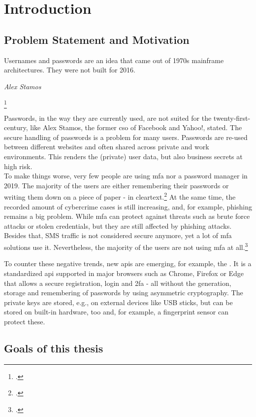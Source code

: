 \chapter{Introduction}
\label{chapter:introduction}

\section{Problem Statement and Motivation}

\setlength{}
\epigraph{\frqq Usernames and passwords are an idea that came out of 1970s mainframe architectures. They were not built for 2016.\flqq\footnotemark}{\textit{Alex Stamos}}
\footcitetext[See][]{stamos}

Passwords, in the way they are currently used, are not suited for the twenty-first-century, like Alex Stamos, the former \gls{cso} of Facebook and Yahoo!, stated. The secure handling of passwords is a problem for many users. Passwords are re-used between different websites and often shared across private and work environments. This renders the (private) user data, but also business secrets at high risk.\\
To make things worse, very few people are using \gls{mfa} nor a password manager in 2019. The majority of the users are either remembering their passwords or writing them down on a piece of paper - in cleartext.\footcites[See][]{ibm-security}[See][]{web-de-passwords}
At the same time, the recorded amount of cybercrime cases is still increasing, and, for example, phishing remains a big problem. While \gls{mfa} can protect against threats such as brute force attacks or stolen credentials, but they are still affected by phishing attacks. Besides that, SMS traffic is not considered secure anymore, yet a lot of \gls{mfa} solutions use it. Nevertheless, the majority of the users are not using \gls{mfa} at all.\footcites[See][]{infratest-dimap}[See][6--7]{bka-cybercrime}

To counter these negative trends, new \glspl{api} are emerging, for example, the \wa. It is a standardized \gls{api} supported in major browsers such as Chrome, Firefox or Edge that allows  a secure registration, login and \gls{2fa} - all without the generation, storage and remembering of passwords by using asymmetric cryptography. The private keys are stored, e.g., on external devices like USB sticks, but can be stored on built-in hardware, too and, for example, a fingerprint sensor can protect these.

\section{Goals of this thesis}

